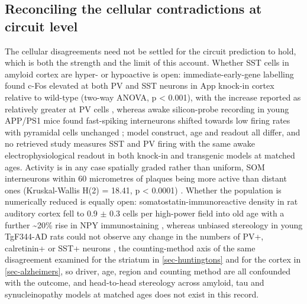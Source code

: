 \documentclass[11pt]{article}
\begin{document}
\subsection{Reconciling the cellular contradictions at circuit level}
\label{sec-08-reconciliation}

The cellular disagreements need not be settled for the circuit prediction to hold, which is both the strength and the limit of this account. Whether SST cells in amyloid cortex are hyper- or hypoactive is open: immediate-early-gene labelling found c-Fos elevated at both PV and SST neurons in App knock-in cortex relative to wild-type (two-way ANOVA, p < 0.001), with the increase reported as relatively greater at PV cells \citep{MelgosaEcenarro2026}, whereas awake silicon-probe recording in young APP/PS1 mice found fast-spiking interneurons shifted towards low firing rates with pyramidal cells unchanged \citep{Meftah2026}; model construct, age and readout all differ, and no retrieved study measures SST and PV firing with the same awake electrophysiological readout in both knock-in and transgenic models at matched ages. Activity is in any case spatially graded rather than uniform, SOM interneurons within 60 micrometres of plaques being more active than distant ones (Kruskal-Wallis H(2) = 18.41, p < 0.0001) \citep{Algamal2022a}. Whether the population is numerically reduced is equally open: somatostatin-immunoreactive density in rat auditory cortex fell to 0.9 $\pm$ 0.3 cells per high-power field into old age with a further \textasciitilde{}20\% rise in NPY immunostaining \citep{Ouellet2014}, whereas unbiased stereology in young TgF344-AD rats could not observe any change in the numbers of PV+, calretinin+ or SST+ neurons \citep{Futacsi2025}, the counting-method axis of the same disagreement examined for the striatum in \ref{sec-huntingtons} and for the cortex in \ref{sec-alzheimers}, so driver, age, region and counting method are all confounded with the outcome, and head-to-head stereology across amyloid, tau and synucleinopathy models at matched ages does not exist in this record.
\end{document}

